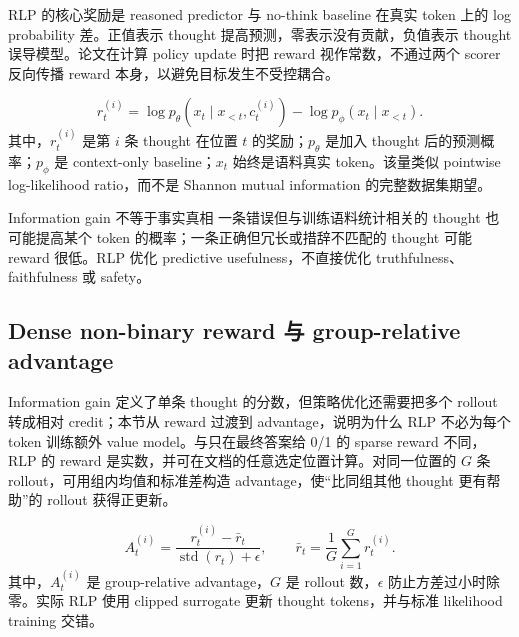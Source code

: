 RLP 的核心奖励是 reasoned predictor 与 no-think baseline 在真实 token 上的 log probability 差。正值表示 thought 提高预测，零表示没有贡献，负值表示 thought 误导模型。论文在计算 policy update 时把 reward 视作常数，不通过两个 scorer 反向传播 reward 本身，以避免目标发生不受控耦合。


\[
r_t^{(i)}
=\log p_\theta(x_t\mid x_{<t},c_t^{(i)})
-\log p_\phi(x_t\mid x_{<t}).
\]
其中，$r_t^{(i)}$ 是第 $i$ 条 thought 在位置 $t$ 的奖励；$p_\theta$ 是加入 thought 后的预测概率；$p_\phi$ 是 context-only baseline；$x_t$ 始终是语料真实 token。该量类似 pointwise log-likelihood ratio，而不是 Shannon mutual information 的完整数据集期望。


\begin{warningbox}{Information gain 不等于事实真相}
一条错误但与训练语料统计相关的 thought 也可能提高某个 token 的概率；一条正确但冗长或措辞不匹配的 thought 可能 reward 很低。RLP 优化 predictive usefulness，不直接优化 truthfulness、faithfulness 或 safety。
\end{warningbox}

\subsection{Dense non-binary reward 与 group-relative advantage}

Information gain 定义了单条 thought 的分数，但策略优化还需要把多个 rollout 转成相对 credit；本节从 reward 过渡到 advantage，说明为什么 RLP 不必为每个 token 训练额外 value model。与只在最终答案给 0/1 的 sparse reward 不同，RLP 的 reward 是实数，并可在文档的任意选定位置计算。对同一位置的 $G$ 条 rollout，可用组内均值和标准差构造 advantage，使“比同组其他 thought 更有帮助”的 rollout 获得正更新。


\[
A_t^{(i)}
=\frac{r_t^{(i)}-\bar r_t}{\operatorname{std}(r_t)+\epsilon},
\qquad
\bar r_t=\frac{1}{G}\sum_{i=1}^{G}r_t^{(i)}.
\]
其中，$A_t^{(i)}$ 是 group-relative advantage，$G$ 是 rollout 数，$\epsilon$ 防止方差过小时除零。实际 RLP 使用 clipped surrogate 更新 thought tokens，并与标准 likelihood training 交错。

